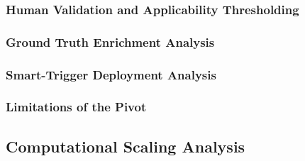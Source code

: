 \subsubsection{Human Validation and Applicability Thresholding}

\subsubsection{Ground Truth Enrichment Analysis}

\subsubsection{Smart-Trigger Deployment Analysis}

\subsubsection{Limitations of the Pivot}

\subsection{Computational Scaling Analysis}
\label{sec:discussion_computational}


